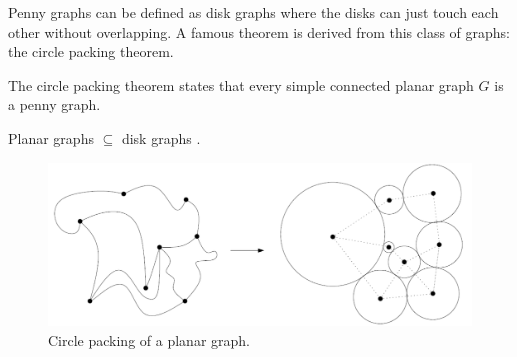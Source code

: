 Penny graphs can be defined as disk graphs where the disks can just touch each
other without overlapping. A famous theorem is derived from this class of graphs:
the circle packing theorem.

\begin{theorem}
  The circle packing theorem states that every simple connected planar graph
  $G$ is a penny graph. \cite{doi:10.1137/0406017}
\end{theorem}

\begin{corollary}
  Planar graphs $\subseteq$ disk graphs \cite{spinradEfficientGraphRepresentations2012}.
\end{corollary}

\begin{figure}
\centering
\includegraphics[width=1.0\textwidth]{res/circle_packing}
\caption{Circle packing of a planar graph. \cite{nachmiasPlanarMapsRandom2016}}
\label{fig:circle}
\end{figure}
